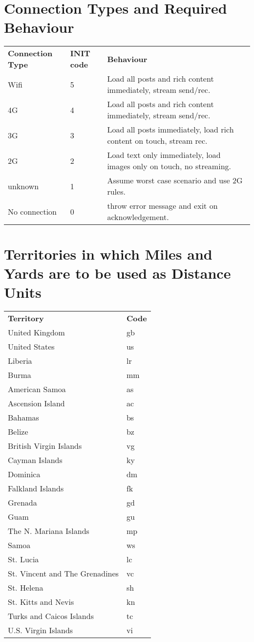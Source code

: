 \documentclass[12pt, a4paper]{article}
\begin{document}
\begin{appendices}
\section{Connection Types and Required Behaviour}
\begin{table}[ht]
\centering
\label{my-label}
\begin{tabular}{lll}
\textbf{Connection Type} & \textbf{INIT code} & \textbf{Behaviour}\\
Wifi & 5 & Load all posts and rich content immediately, stream send/rec.\\
4G & 4 & Load all posts and rich content immediately, stream send/rec.\\
3G & 3 & Load all posts immediately, load rich content on touch, stream rec.\\
2G & 2 & Load text only immediately, load images only on touch, no streaming.\\
unknown & 1 & Assume worst case scenario and use 2G rules.\\
No connection & 0 & throw error message and exit on acknowledgement.\\
\end{tabular}
\end{table}
\section{Territories in which Miles and Yards are to be used as Distance Units}
\begin{table}[ht]
\centering
\label{my-label}
\begin{tabular}{ll}
\textbf{Territory} & \textbf{Code}\\
United Kingdom & gb\\
United States & us\\
Liberia & lr\\
Burma & mm\\
American Samoa & as\\
Ascension Island & ac\\
Bahamas & bs\\
Belize & bz\\
British Virgin Islands & vg\\
Cayman Islands & ky\\
Dominica & dm\\
Falkland Islands & fk\\
Grenada & gd\\
Guam & gu\\
The N. Mariana Islands & mp\\
Samoa & ws\\
St. Lucia & lc\\
St. Vincent and The Grenadines & vc\\
St. Helena & sh\\
St. Kitts and Nevis & kn\\
Turks and Caicos Islands & tc\\
U.S. Virgin Islands & vi\\
\end{tabular}
\end{table}
\end{appendices}
\end{document}
